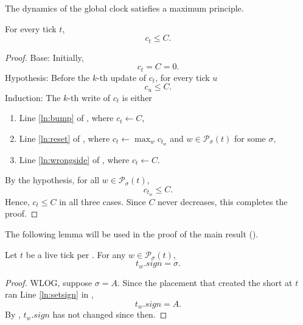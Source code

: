 The dynamics of the global clock satisfies a maximum principle.
\begin{proposition} \label{proposition:maximum}
    For every tick $t$,
    \begin{equation*}
        c_t\leq C.
    \end{equation*}
\end{proposition}
\begin{proof}
    Base: Initially,
    \begin{equation*}
        c_t=C=0.
    \end{equation*}
    Hypothesis: Before the $k$-th update of $c_t$, for every tick $u$
    \begin{equation*}
        c_u\leq C.
    \end{equation*}
    Induction: The $k$-th write of $c_t$ is either
    \begin{enumerate}
        \item Line \ref{ln:bump} of , where $c_t\gets C$,
        \item Line \ref{ln:reset} of , where $c_t\gets\max_{w}c_{t_w}$ and $w\in\mathcal{P}_\sigma(t)$ for some $\sigma$,
        \item Line \ref{ln:wrongside} of , where $c_t\gets C$.
    \end{enumerate}
    By the hypothesis, for all $w\in\mathcal{P}_\sigma(t)$,
    \begin{equation*}
        c_{t_w}\leq C.
    \end{equation*}
    Hence, $c_t\leq C$ in all three cases.
    Since $C$ never decreases, this completes the proof.
\end{proof}
The following lemma will be used in the proof of the main result ().
\begin{lemma} \label{lem:nowrong}
    Let $t$ be a live tick per . For any $w\in\mathcal{P}_\sigma(t)$,
    \begin{equation*}
        t_w.\mathit{sign}=\sigma.
    \end{equation*}
\end{lemma}
\begin{proof}
    WLOG, suppose $\sigma=A$.
    Since the placement that created the short at $t$ ran Line \ref{ln:setsign} in , 
    \begin{equation*}
        t_w.\mathit{sign}=A.
    \end{equation*}
    By , $t_w.sign$ has not changed since then.
\end{proof}